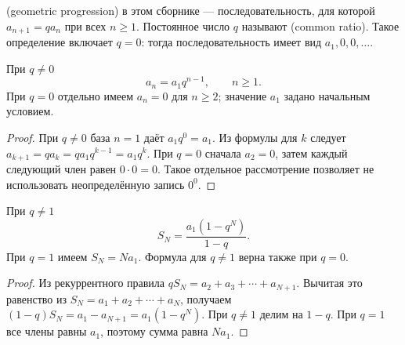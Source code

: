 \ifdim\dimexpr\ht\CatFlowBox+\dp\CatFlowBox\relax<64mm\dp\CatFlowBox=\dimexpr64mm-\ht\CatFlowBox\relax\fi%
\noindent\usebox{\CatFlowBox}\par\addvspace{5pt}

\begin{definition}
 (geometric progression) в этом сборнике — последовательность, для которой \(a_{n+1}=q a_n\) при всех \(n\geq1\). Постоянное число \(q\) называют  (common ratio). Такое определение включает \(q=0\): тогда последовательность имеет вид \(a_1,0,0,\ldots\).
\end{definition}
\begin{theorem}\label{thm:legacy-c12-3}
При \(q\neq0\)
\[
a_n=a_1q^{n-1},\qquad n\geq1.
\]
При \(q=0\) отдельно имеем \(a_n=0\) для \(n\geq2\); значение \(a_1\) задано начальным условием.
\end{theorem}
\begin{proof}
При \(q\neq0\) база \(n=1\) даёт \(a_1q^0=a_1\). Из формулы для \(k\) следует \(a_{k+1}=q a_k=q a_1q^{k-1}=a_1q^k\). При \(q=0\) сначала \(a_2=0\), затем каждый следующий член равен \(0\cdot0=0\). Такое отдельное рассмотрение позволяет не использовать неопределённую запись \(0^0\).
\end{proof}
\begin{theorem}\label{thm:legacy-c12-4}
При \(q\neq1\)
\[
S_N=\frac{a_1(1-q^N)}{1-q}.
\]
При \(q=1\) имеем \(S_N=Na_1\). Формула для \(q\neq1\) верна также при \(q=0\).
\end{theorem}
\begin{proof}
Из рекуррентного правила
\(qS_N=a_2+a_3+\cdots+a_{N+1}\). Вычитая это равенство из \(S_N=a_1+a_2+\cdots+a_N\), получаем \((1-q)S_N=a_1-a_{N+1}=a_1(1-q^N)\). При \(q\neq1\) делим на \(1-q\). При \(q=1\) все члены равны \(a_1\), поэтому сумма равна \(Na_1\).
\end{proof}

